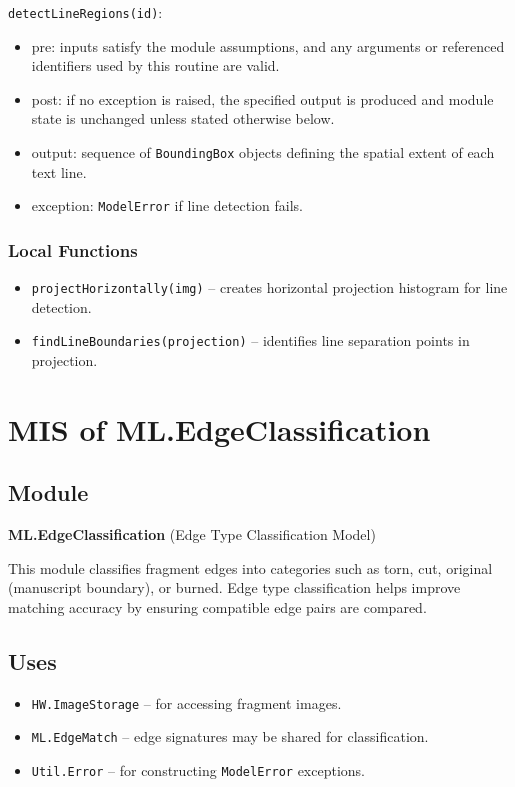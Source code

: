 \documentclass[12pt, titlepage]{article}
\begin{document}
\noindent \texttt{detectLineRegions(id)}:
\begin{itemize}
    \item pre: inputs satisfy the module assumptions, and any arguments or referenced identifiers used by this routine are valid.
    \item post: if no exception is raised, the specified output is produced and module state is unchanged unless stated otherwise below.
    \item output: sequence of \texttt{BoundingBox} objects defining the spatial extent of each text line.
    \item exception: \texttt{ModelError} if line detection fails.
\end{itemize}

\subsubsection{Local Functions}
\begin{itemize}
    \item \texttt{projectHorizontally(img)} – creates horizontal projection histogram for line detection.
    \item \texttt{findLineBoundaries(projection)} – identifies line separation points in projection.
\end{itemize}



\section{MIS of ML.EdgeClassification} \label{ML.EdgeClassification}

\subsection{Module}
\textbf{ML.EdgeClassification} \; (Edge Type Classification Model)

This module classifies fragment edges into categories such as torn, cut, original (manuscript boundary), or burned. Edge type classification helps improve matching accuracy by ensuring compatible edge pairs are compared.

\subsection{Uses}
\begin{itemize}
    \item \texttt{HW.ImageStorage} – for accessing fragment images.
    \item \texttt{ML.EdgeMatch} – edge signatures may be shared for classification.
    \item \texttt{Util.Error} – for constructing \texttt{ModelError} exceptions.
\end{itemize}
\end{document}
